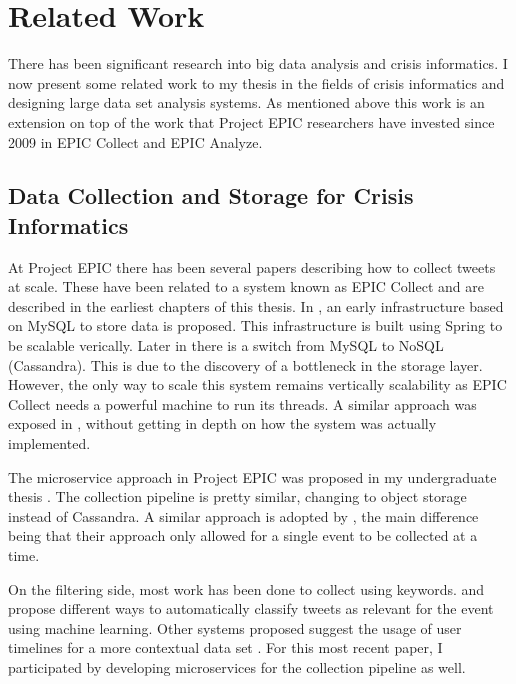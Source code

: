 \chapter{Related Work}

There has been significant research into big data analysis and crisis informatics. I now present some related work to my thesis in the fields of crisis informatics and designing large data set analysis systems.  As mentioned above this work is an extension on top of the work that Project EPIC researchers have invested since 2009 in EPIC Collect and EPIC Analyze. 

\section{Data Collection and Storage for Crisis Informatics}

At Project EPIC there has been several papers describing how to collect tweets at scale. These have been related to a system known as EPIC Collect and are described in the earliest chapters of this thesis. In \cite{anderson2011design}, an early infrastructure based on MySQL to store data is proposed. This infrastructure is built using Spring to be scalable verically. Later in \cite{schram2012mysql} there is a switch from MySQL to NoSQL (Cassandra). This is due to the discovery of a bottleneck in the storage layer. However, the only way to scale this system remains vertically scalability as EPIC Collect needs a powerful machine to run its threads. A similar approach was exposed in \cite{kumar2011tweettracker}, without getting in depth on how the system was actually implemented.

The microservice approach in Project EPIC was proposed in my undergraduate thesis \cite{casas2017big}. The collection pipeline is pretty similar, changing to object storage instead of Cassandra. A similar approach is adopted by \cite{khaleq2018cloud}, the main difference being that their approach only allowed for a single event to be collected at a time. 

On the filtering side, most work has been done to collect using keywords. \cite{kejriwal2019pipeline} and \cite{khaleq2018cloud} propose different ways to automatically classify tweets as relevant for the event using machine learning. Other systems proposed suggest the usage of user timelines for a more contextual data set \cite{anderson2019incorporating}. For this most recent paper, I participated by developing microservices for the collection pipeline as well.

